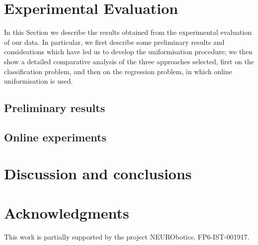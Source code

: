 \documentclass[journal]{IEEEtran}
\begin{document}
\section{Experimental Evaluation}
\label{sec:exp}

In this Section we describe the results obtained from the experimental
evaluation of our data. In particular, we first describe some
preliminary results and consideations which have led us to develop the
uniformisation procedure; we then show a detailed comparative analysis
of the three approaches selected, first on the classification problem,
and then on the regression problem, in which online uniformisation is
used.

\subsection{Preliminary results}
\label{subsec:strategy}


\subsection{Online experiments}
\label{subsec:online}


\section{Discussion and conclusions}
\label{sec:discussion}


\section*{Acknowledgments}

This work is partially supported by the project NEURObotics,
FP6-IST-001917.

{\small


}


\end{document}
